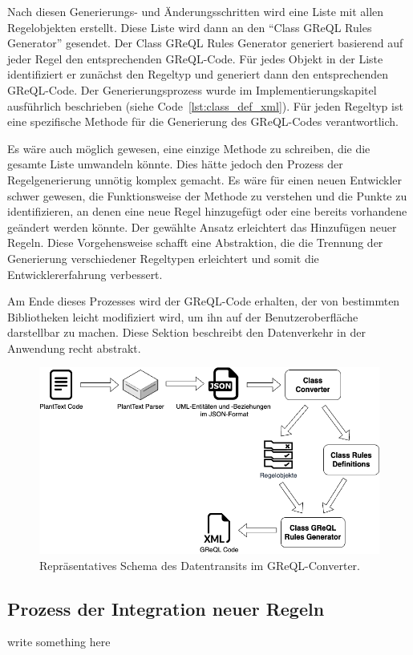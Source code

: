 Nach diesen Generierungs- und Änderungsschritten wird eine Liste mit allen Regelobjekten erstellt. Diese Liste wird
dann an den ``Class GReQL Rules Generator'' gesendet. Der Class GReQL Rules Generator generiert basierend auf jeder
Regel den entsprechenden GReQL-Code. Für jedes Objekt in der Liste identifiziert er zunächst den Regeltyp und generiert
dann den entsprechenden GReQL-Code. Der Generierungsprozess wurde im Implementierungskapitel ausführlich beschrieben
(siehe Code~\ref{lst:class_def_xml}). Für jeden Regeltyp ist eine spezifische Methode für die Generierung des
GReQL-Codes verantwortlich.

Es wäre auch möglich gewesen, eine einzige Methode zu schreiben, die die gesamte Liste umwandeln könnte. Dies hätte
jedoch den Prozess der Regelgenerierung unnötig komplex gemacht. Es wäre für einen neuen Entwickler schwer gewesen, die
Funktionsweise der Methode zu verstehen und die Punkte zu identifizieren, an denen eine neue Regel hinzugefügt oder
eine bereits vorhandene geändert werden könnte. Der gewählte Ansatz erleichtert das Hinzufügen neuer Regeln. Diese
Vorgehensweise schafft eine Abstraktion, die die Trennung der Generierung verschiedener Regeltypen erleichtert und somit
die Entwicklererfahrung verbessert.

Am Ende dieses Prozesses wird der GReQL-Code erhalten, der von bestimmten Bibliotheken leicht modifiziert wird, um ihn
auf der Benutzeroberfläche darstellbar zu machen. Diese Sektion beschreibt den Datenverkehr in der Anwendung recht
abstrakt.

\begin{figure}[h!]
    \centering
    \includegraphics[width=12cm]{images/transit}
    \caption{Repräsentatives Schema des Datentransits im GReQL-Converter.}
    \label{fig:transit}
\end{figure}

\subsection{Prozess der Integration neuer Regeln}
write something here

